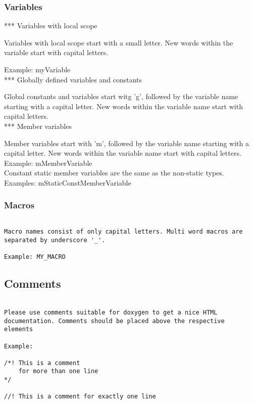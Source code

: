 \subsubsection{Variables}

*** Variables with local scope 

Variables with local scope start with a small letter. New words
within the variable start with capital letters.

Example: myVariable
\\

*** Globally defined variables and constants

Global constants and variables start witg 'g', followed by the
variable name starting with a capital letter. New words within the
variable name start with capital letters.
\\

*** Member variables

Member variables start with 'm', followed by the variable name
starting with a capital letter. New words within the variable name
start with capital letters.
\\

Example: mMemberVariable
\\

Constant static member variables are the same as the
non-static types. 
\\

Examples: mStaticConstMemberVariable

\subsubsection{Macros}
\begin{verbatim}

Macro names consist of only capital letters. Multi word macros are
separated by underscore '_'.

Example: MY_MACRO

\end{verbatim}
\subsection{Comments}
\begin{verbatim}

Please use comments suitable for doxygen to get a nice HTML
documentation. Comments should be placed above the respective
elements

Example:

/*! This is a comment 
    for more than one line
*/

//! This is a comment for exactly one line

\end{verbatim}
